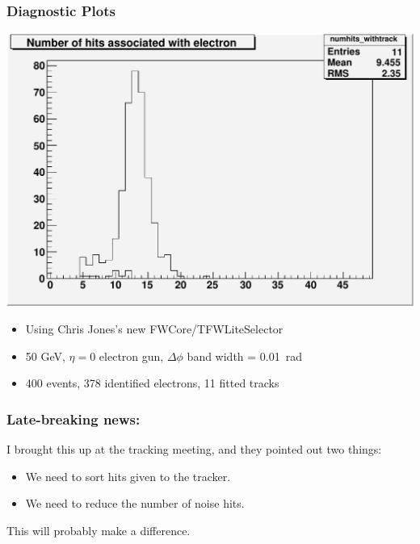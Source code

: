\documentclass[12pt,compress]{beamer}
\begin{document}
\begin{frame}
\frametitle{Diagnostic Plots}

\vspace{-0.5 cm}
\begin{center}
\includegraphics[width=0.6\linewidth]{numhits_withtrack_overlay}
\end{center}

\vspace{-0.3 cm}
\begin{itemize}
\item Using Chris Jones's new FWCore/TFWLiteSelector
\item 50 GeV, $\eta=0$ electron gun, $\Delta \phi$ band width = 0.01~rad
\item 400 events, 378 identified electrons, 11 fitted tracks
\end{itemize}
\end{frame}

\begin{frame}
\frametitle{Late-breaking news:}

I brought this up at the tracking meeting, and they pointed out two things:

\vspace{0.25 cm}
\begin{itemize}\setlength{\itemsep}{0.25 cm}
\item We need to sort hits given to the tracker.
\item We need to reduce the number of noise hits.
\end{itemize}

\vspace{0.25 cm}
This will probably make a difference.

\end{frame}
\end{document}
